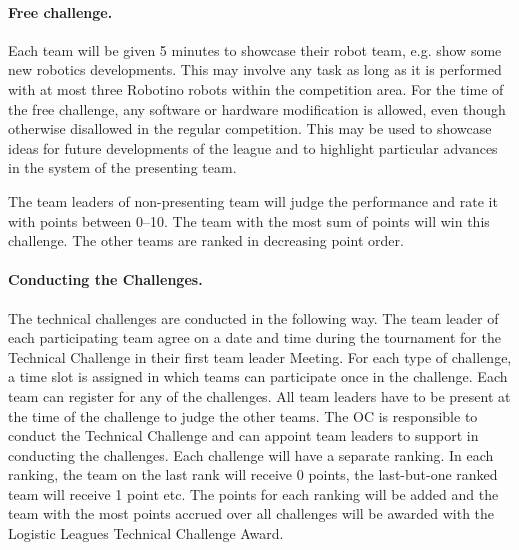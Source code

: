 \documentclass[12pt,twoside]{article}
\begin{document}
\paragraph{Free challenge.~}
Each team will be given 5 minutes to showcase their robot team, e.g.
show some new robotics developments. This may involve any task as long
as it is performed with at most three Robotino robots within the
competition area. For the time of the free challenge, any software or
hardware modification is allowed, even though otherwise disallowed in
the regular competition. This may be used to showcase ideas for future
developments of the league and to highlight particular advances in the
system of the presenting team.

The team leaders of non-presenting team will judge the performance and
rate it with points between 0--10.  The team with the most sum of
points will win this challenge. The other teams are ranked in
decreasing point order.

\paragraph{Conducting the Challenges.~}
The technical challenges are conducted in the following way. The team
leader of each participating team agree on a date and time during the
tournament for the Technical Challenge in their first team leader
Meeting. For each type of challenge, a time slot is assigned in which
teams can participate once in the challenge. Each team can register
for any of the challenges. All team leaders have to be present at the
time of the challenge to judge the other teams. The OC is responsible
to conduct the Technical Challenge and can appoint team leaders to
support in conducting the challenges. Each challenge will have a
separate ranking. In each ranking, the team on the last rank will
receive 0 points, the last-but-one ranked team will receive 1 point
etc. The points for each ranking will be added and the team with the
most points accrued over all challenges will be awarded with the
Logistic Leagues Technical Challenge Award.






\end{document}
